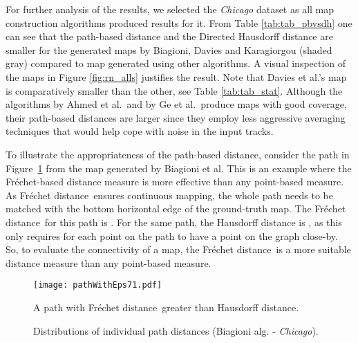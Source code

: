 \documentclass[natbib]{svjour3}                    \smartqed  \usepackage[table]{xcolor}
\newcommand{\Frd}{Fr\'echet distance}
\begin{document}
For further analysis of the results, we selected the \emph{Chicago} dataset as all map construction algorithms produced results for it.
From Table \ref{tab:tab_pbvsdh} one can see that the path-based distance and the Directed Hausdorff distance are smaller for the generated maps by Biagioni, Davies and Karagiorgou (shaded gray) compared to map generated using other algorithms. A visual inspection of the maps in Figure \ref{fig:rn_alls} justifies the result. Note that Davies et al.'s \cite{Davies:2006:SDR:1175887.1176088} map is comparatively smaller than the other, see Table \ref{tab:tab_stat}.
Although the algorithms by Ahmed et al.\ and by Ge et al.\ produce maps with good coverage, their path-based distances are larger since they employ less aggressive averaging techniques that would help cope with noise in the input tracks.


To illustrate the appropriateness of the path-based distance, consider the path in Figure~\ref{fig:james_larger_fr} from the map generated by Biagioni et al. This is an example where the Fr\'echet-based distance measure is more effective than any point-based measure. As \Frd\ ensures continuous mapping, the whole path needs to be matched with the bottom horizontal edge of the ground-truth map. The \Frd\ for this path is . For the same path, the Hausdorff distance is , as this only requires for each point on the path to have a point on the graph close-by. So, to evaluate the connectivity of a map, the \Frd\ is a more suitable distance measure than any point-based measure.

\begin{figure}[htbp]
\begin{center} 	
\texttt{[image: pathWithEps71.pdf]}
\caption{A path with \Frd\ greater than Hausdorff distance.}
\label{fig:james_larger_fr}
\end{center}
\vspace*{-2ex}
\end{figure}


\begin{figure}[htbp]
\begin{center}
 \end{center}
 \caption{Distributions of individual path distances (Biagioni alg. - \emph{Chicago}).}
 \label{fig:distribution}
\vspace*{-2ex}
\end{figure}
\end{document}
